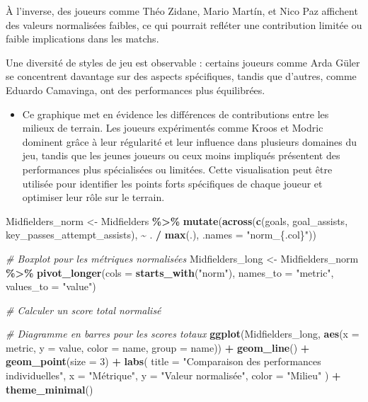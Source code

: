\documentclass[
  6pt,
]{article}
\newenvironment{Shaded}{\begin{snugshade}}{\end{snugshade}}
\newcommand{\AttributeTok}[1]{\textcolor[rgb]{0.13,0.29,0.53}{#1}}
\newcommand{\CommentTok}[1]{\textcolor[rgb]{0.56,0.35,0.01}{\textit{#1}}}
\newcommand{\DecValTok}[1]{\textcolor[rgb]{0.00,0.00,0.81}{#1}}
\newcommand{\FunctionTok}[1]{\textcolor[rgb]{0.13,0.29,0.53}{\textbf{#1}}}
\newcommand{\NormalTok}[1]{#1}
\newcommand{\OtherTok}[1]{\textcolor[rgb]{0.56,0.35,0.01}{#1}}
\newcommand{\SpecialCharTok}[1]{\textcolor[rgb]{0.81,0.36,0.00}{\textbf{#1}}}
\newcommand{\StringTok}[1]{\textcolor[rgb]{0.31,0.60,0.02}{#1}}
\providecommand{\tightlist}{%
  \setlength{\itemsep}{0pt}\setlength{\parskip}{0pt}}
\begin{document}
À l'inverse, des joueurs comme Théo Zidane, Mario Martín, et Nico Paz
affichent des valeurs normalisées faibles, ce qui pourrait refléter une
contribution limitée ou faible implications dans les matchs.

Une diversité de styles de jeu est observable : certains joueurs comme
Arda Güler se concentrent davantage sur des aspects spécifiques, tandis
que d'autres, comme Eduardo Camavinga, ont des performances plus
équilibrées.

\begin{itemize}
\tightlist
\item
  Ce graphique met en évidence les différences de contributions entre
  les milieux de terrain. Les joueurs expérimentés comme Kroos et Modric
  dominent grâce à leur régularité et leur influence dans plusieurs
  domaines du jeu, tandis que les jeunes joueurs ou ceux moins impliqués
  présentent des performances plus spécialisées ou limitées. Cette
  visualisation peut être utilisée pour identifier les points forts
  spécifiques de chaque joueur et optimiser leur rôle sur le terrain.
\end{itemize}

\begin{Shaded}
\begin{Highlighting}[]
\NormalTok{Midfielders\_norm }\OtherTok{\textless{}{-}}\NormalTok{ Midfielders }\SpecialCharTok{\%\textgreater{}\%}
  \FunctionTok{mutate}\NormalTok{(}\FunctionTok{across}\NormalTok{(}\FunctionTok{c}\NormalTok{(goals, goal\_assists, key\_passes\_attempt\_assists), }\SpecialCharTok{\textasciitilde{}}\NormalTok{ . }\SpecialCharTok{/} \FunctionTok{max}\NormalTok{(.), }\AttributeTok{.names =} \StringTok{"norm\_\{.col\}"}\NormalTok{))}

\CommentTok{\# Boxplot pour les métriques normalisées}
\NormalTok{Midfielders\_long }\OtherTok{\textless{}{-}}\NormalTok{ Midfielders\_norm }\SpecialCharTok{\%\textgreater{}\%}
  \FunctionTok{pivot\_longer}\NormalTok{(}\AttributeTok{cols =} \FunctionTok{starts\_with}\NormalTok{(}\StringTok{"norm"}\NormalTok{), }\AttributeTok{names\_to =} \StringTok{"metric"}\NormalTok{, }\AttributeTok{values\_to =} \StringTok{"value"}\NormalTok{)}

\CommentTok{\# Calculer un score total normalisé}

\CommentTok{\# Diagramme en barres pour les scores totaux}
\FunctionTok{ggplot}\NormalTok{(Midfielders\_long, }\FunctionTok{aes}\NormalTok{(}\AttributeTok{x =}\NormalTok{ metric, }\AttributeTok{y =}\NormalTok{ value, }\AttributeTok{color =}\NormalTok{ name, }\AttributeTok{group =}\NormalTok{ name)) }\SpecialCharTok{+}
  \FunctionTok{geom\_line}\NormalTok{() }\SpecialCharTok{+}
  \FunctionTok{geom\_point}\NormalTok{(}\AttributeTok{size =} \DecValTok{3}\NormalTok{) }\SpecialCharTok{+}
  \FunctionTok{labs}\NormalTok{(}
    \AttributeTok{title =} \StringTok{"Comparaison des performances individuelles"}\NormalTok{,}
    \AttributeTok{x =} \StringTok{"Métrique"}\NormalTok{,}
    \AttributeTok{y =} \StringTok{"Valeur normalisée"}\NormalTok{,}
    \AttributeTok{color =} \StringTok{"Milieu"}
\NormalTok{  ) }\SpecialCharTok{+}
  \FunctionTok{theme\_minimal}\NormalTok{()}
\end{Highlighting}
\end{Shaded}
\end{document}

